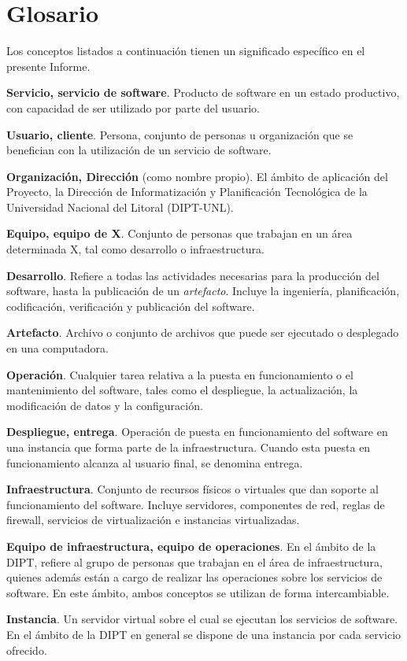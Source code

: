 \chapter{Glosario}

Los conceptos listados a continuación tienen un significado específico en el presente Informe.

\textbf{Servicio, servicio de software}. Producto de software en un estado productivo, con capacidad de ser utilizado por parte del usuario.

\textbf{Usuario, cliente}. Persona, conjunto de personas u organización que se benefician con la utilización de un servicio de software.

\textbf{Organización, Dirección} (como nombre propio). El ámbito de aplicación del Proyecto, la Dirección de Informatización y Planificación Tecnológica de la Universidad Nacional del Litoral (DIPT-UNL).

\textbf{Equipo, equipo de X}. Conjunto de personas que trabajan en un área determinada X, tal como desarrollo o infraestructura.

\textbf{Desarrollo}. Refiere a todas las actividades necesarias para la producción del software, hasta la publicación de un \textit{artefacto}. Incluye la ingeniería, planificación, codificación, verificación y publicación del software.

\textbf{Artefacto}. Archivo o conjunto de archivos que puede ser ejecutado o desplegado en una computadora.

\textbf{Operación}. Cualquier tarea relativa a la puesta en funcionamiento o el mantenimiento del software, tales como el despliegue, la actualización, la modificación de datos y la configuración.

\textbf{Despliegue, entrega}. Operación de puesta en funcionamiento del software en una instancia que forma parte de la infraestructura. Cuando esta puesta en funcionamiento alcanza al usuario final, se denomina entrega.

\textbf{Infraestructura}. Conjunto de recursos físicos o virtuales que dan soporte al funcionamiento del software. Incluye servidores, componentes de red, reglas de firewall, servicios de virtualización e instancias virtualizadas.

\textbf{Equipo de infraestructura, equipo de operaciones}. En el ámbito de la DIPT, refiere al grupo de personas que trabajan en el área de infraestructura, quienes además están a cargo de realizar las operaciones sobre los servicios de software. En este ámbito, ambos conceptos se utilizan de forma intercambiable.

\textbf{Instancia}. Un servidor virtual sobre el cual se ejecutan los servicios de software. En el ámbito de la DIPT en general se dispone de una instancia por cada servicio ofrecido.
